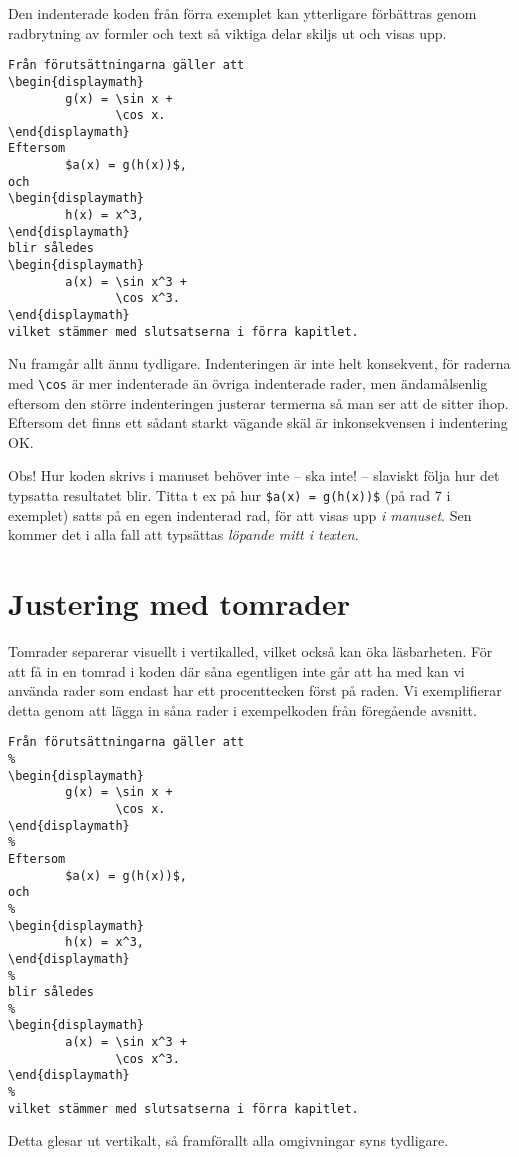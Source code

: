 \documentclass[a4paper,12pt]{article}
\begin{document}
Den indenterade koden från förra exemplet kan ytterligare förbättras
genom radbrytning av formler och text så viktiga delar skiljs ut och
visas upp.  
%
\begin{lstlisting}
Från förutsättningarna gäller att
\begin{displaymath}
        g(x) = \sin x + 
               \cos x. 
\end{displaymath}
Eftersom 
        $a(x) = g(h(x))$, 
och 
\begin{displaymath}
        h(x) = x^3,
\end{displaymath}
blir således 
\begin{displaymath}
        a(x) = \sin x^3 + 
               \cos x^3.
\end{displaymath}
vilket stämmer med slutsatserna i förra kapitlet.
\end{lstlisting}
%
Nu framgår allt ännu tydligare. Indenteringen är inte helt konsekvent,
för raderna med \verb|\cos| är mer indenterade än övriga indenterade
rader, men ändamålsenlig eftersom den större indenteringen justerar
termerna så man ser att de sitter ihop. Eftersom det finns ett sådant
starkt vägande skäl är inkonsekvensen i indentering OK. 


Obs! Hur koden skrivs i manuset behöver inte -- ska inte! -- slaviskt följa
hur det typsatta resultatet blir. Titta t ex på hur 
    \verb|$a(x) = g(h(x))$| (på rad 7 i exemplet) 
satts på en egen indenterad rad, för att visas upp \emph{i manuset}. 
Sen kommer det i alla fall att typsättas \emph{löpande mitt i texten}. 


\section{Justering med tomrader}


Tomrader separerar visuellt i vertikalled, vilket också kan öka
läsbarheten. För att få in en tomrad i koden där såna egentligen inte
går att ha med kan vi använda rader som endast har ett procenttecken
först på raden. Vi exemplifierar detta genom att lägga in såna rader i
exempelkoden från föregående avsnitt.
%
\begin{lstlisting}
Från förutsättningarna gäller att
%
\begin{displaymath}
        g(x) = \sin x + 
               \cos x. 
\end{displaymath}
%
Eftersom 
        $a(x) = g(h(x))$, 
och 
%
\begin{displaymath}
        h(x) = x^3,
\end{displaymath}
%
blir således 
%
\begin{displaymath}
        a(x) = \sin x^3 + 
               \cos x^3.
\end{displaymath}
%
vilket stämmer med slutsatserna i förra kapitlet.
\end{lstlisting}
%
Detta glesar ut vertikalt, så framförallt alla omgivningar syns tydligare.
\end{document}
